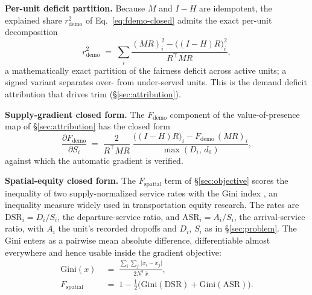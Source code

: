\textbf{Per-unit deficit partition.} Because $M$ and $I-H$ are idempotent,
the explained share $r^{2}_{\mathrm{demo}}$ of Eq.~\eqref{eq:fdemo-closed}
admits the exact per-unit decomposition
\begin{equation}\label{eq:unit-attr}
r^{2}_{\mathrm{demo}}
\;=\; \sum_i \frac{(MR)_i^{2} - \bigl((I-H)R\bigr)_i^{2}}{R^{\top}MR},
\end{equation}
a mathematically exact partition of the fairness deficit across active
units; a signed variant separates over- from under-served units. This is
the demand deficit attribution that drives trim (\S\ref{sec:attribution}).

\textbf{Supply-gradient closed form.} The $F_{\mathrm{demo}}$ component of
the value-of-presence map of \S\ref{sec:attribution} has the closed form
\begin{equation}\label{eq:supply-grad}
\frac{\partial F_{\mathrm{demo}}}{\partial S_i}
\;=\; \frac{2}{R^{\top}MR}\;
\frac{\bigl((I-H)R\bigr)_i - F_{\mathrm{demo}}\,(MR)_i}{\max(D_i,\, d_0)},
\end{equation}
against which the automatic gradient is verified.

\textbf{Spatial-equity closed form.} The $F_{\mathrm{spatial}}$ term of
\S\ref{sec:objective} scores the inequality of two supply-normalized
service rates with the Gini index
\cite{su2018taxigini,horchergraham2021,karner2024}, an inequality measure
widely used in transportation equity research. The rates are
$\mathrm{DSR}_i = D_i / S_i$, the departure-service ratio, and
$\mathrm{ASR}_i = A_i / S_i$, the arrival-service ratio, with $A_i$ the
unit's recorded dropoffs and $D_i$, $S_i$ as in \S\ref{sec:problem}. The Gini enters as a pairwise
mean absolute difference, differentiable almost everywhere and hence usable
inside the gradient objective:
\begin{equation}\label{eq:fspatial}
\begin{split}
\mathrm{Gini}(x) &\;=\; \frac{\sum_{i}\sum_{j}\,\lvert x_i - x_j\rvert}
{2N^{2}\,\bar{x}},\\
F_{\mathrm{spatial}} &\;=\; 1 - \tfrac{1}{2}\bigl(\mathrm{Gini}(\mathrm{DSR})
+ \mathrm{Gini}(\mathrm{ASR})\bigr).
\end{split}
\end{equation}

